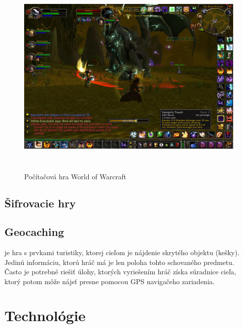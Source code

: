\begin{figure}[h]
  \centering
  \includegraphics[height=10cm]{mainmatter/imgs/wow.jpg}
  \caption{Počítačová hra World of Warcraft}
  \label{fig:comenius}
\end{figure}

\subsection{Šifrovacie hry}

\subsection{Geocaching}\cite{geocaching} je hra s prvkami turistiky, ktorej cieľom je nájdenie skrytého objektu (kešky). Jedinú informáciu, ktorú hráč má je len poloha tohto schovaného predmetu. Často je potrebné riešiť úlohy, ktorých vyriešením hráč získa súradnice cieľa, ktorý potom môže nájsť presne pomocou GPS navigačeho zariadenia.

\section{Technológie}


